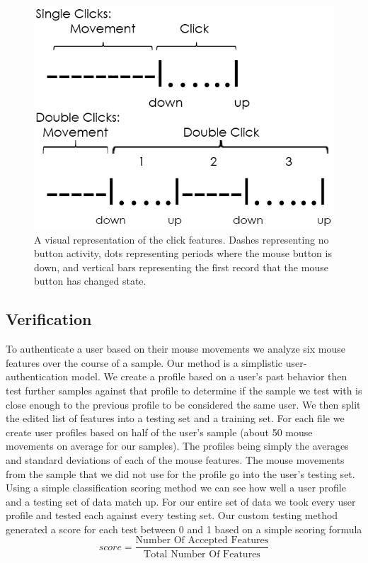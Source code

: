 \documentclass[conference]{IEEEtran}
\begin{document}
\begin{figure}[t]
  \includegraphics[width=1\linewidth]{clickDiag}
  \caption{A visual representation of the click features. Dashes representing no button activity, dots representing periods where the mouse button is down, and vertical bars representing the first record that the mouse button has changed state.  \label{fig:visualdefinition}}
\end{figure}

\subsection{Verification}
	To authenticate a user based on their mouse movements we analyze six mouse features over the course of a sample. Our method is a simplistic user-authentication model. We create a profile based on a user's past behavior then test further samples against that profile to determine if the sample we test with is close enough to the previous profile to be considered the same user.  
We then split the edited list of features into a testing set and a training set. For each file we create user profiles based on half of the user's sample (about 50 mouse movements on average for our samples). The profiles being simply the averages and standard deviations of each of the mouse features. The mouse movements from the sample that we did not use for the profile go into the user's testing set.
Using a simple classification scoring method we can see how well a user profile and a testing set of data match up. For our entire set of data we took every user profile and tested each against every testing set. Our custom testing method generated a score for each test between 0 and 1 based on a simple scoring formula 
\begin{equation} 
score = \frac{\text{Number Of Accepted Features}}{\text{Total Number Of Features}}
\end{equation}
\end{document}
